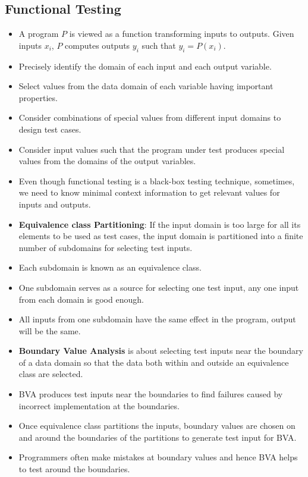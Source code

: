 \documentclass[a4paper]{article}
\begin{document}
\subsection{Functional Testing}
\begin{itemize}
    \item A program $P$ is viewed as a function transforming inputs to outputs. Given inputs $x_i$, $P$ computes outputs $y_i$ such that $y_i = P(x_i)$.
    \item Precisely identify the domain of each input and each output variable.
    \item Select values from the data domain of each variable having important properties.
    \item Consider combinations of special values from different input domains to design test cases.
    \item Consider input values such that the program under test produces special values from the domains of the output variables.
    \item Even though functional testing is a black-box testing technique, sometimes, we need to know minimal context information to get relevant values for inputs and outputs.
    \item \textbf{Equivalence class Partitioning}: If the input domain is too large for all its elements to be used as test cases, the input domain is partitioned into a finite number of subdomains for selecting test inputs.
    \item Each subdomain is known as an equivalence class.
    \item One subdomain serves as a source for selecting one test input, any one input from each domain is good enough.
    \item All inputs from one subdomain have the same effect in the program, output will be the same.
    \item \textbf{Boundary Value Analysis} is about selecting test inputs near the boundary of a data domain so that the data both within and outside an equivalence class are selected.
    \item BVA produces test inputs near the boundaries to find failures caused by incorrect implementation at the boundaries.
    \item Once equivalence class partitions the inputs, boundary values are chosen on and around the boundaries of the partitions to generate test input for BVA.
    \item Programmers often make mistakes at boundary values and hence BVA helps to test around the boundaries.

\end{itemize}
\end{document}
